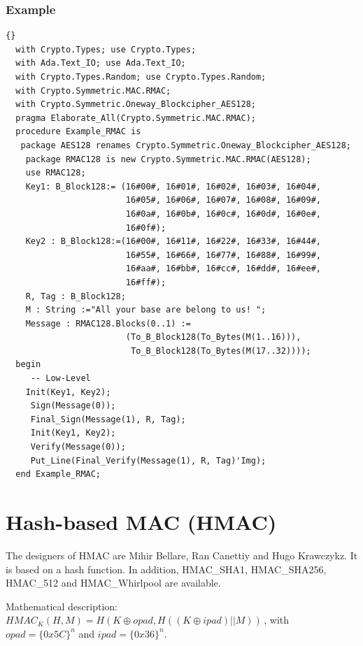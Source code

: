 \subsubsection*{Example}
\begin{lstlisting}{}
  with Crypto.Types; use Crypto.Types;
  with Ada.Text_IO; use Ada.Text_IO;
  with Crypto.Types.Random; use Crypto.Types.Random;
  with Crypto.Symmetric.MAC.RMAC;
  with Crypto.Symmetric.Oneway_Blockcipher_AES128;
  pragma Elaborate_All(Crypto.Symmetric.MAC.RMAC);
  procedure Example_RMAC is
   package AES128 renames Crypto.Symmetric.Oneway_Blockcipher_AES128;
    package RMAC128 is new Crypto.Symmetric.MAC.RMAC(AES128);
    use RMAC128;
    Key1: B_Block128:= (16#00#, 16#01#, 16#02#, 16#03#, 16#04#,
                        16#05#, 16#06#, 16#07#, 16#08#, 16#09#,
                        16#0a#, 16#0b#, 16#0c#, 16#0d#, 16#0e#,
                        16#0f#);
    Key2 : B_Block128:=(16#00#, 16#11#, 16#22#, 16#33#, 16#44#,
                        16#55#, 16#66#, 16#77#, 16#88#, 16#99#,
                        16#aa#, 16#bb#, 16#cc#, 16#dd#, 16#ee#,
                        16#ff#);
    R, Tag : B_Block128;
    M : String :="All your base are belong to us! ";
    Message : RMAC128.Blocks(0..1) :=
                        (To_B_Block128(To_Bytes(M(1..16))),
                         To_B_Block128(To_Bytes(M(17..32))));
  begin
     -- Low-Level
    Init(Key1, Key2);
  	 Sign(Message(0));
  	 Final_Sign(Message(1), R, Tag);
 	 Init(Key1, Key2);
  	 Verify(Message(0));
  	 Put_Line(Final_Verify(Message(1), R, Tag)'Img);
  end Example_RMAC;
\end{lstlisting}


\section{Hash-based MAC (HMAC)}
The designers of HMAC are Mihir Bellare, Ran Canettiy and Hugo
Krawczykz. It is based on a hash function. In addition, HMAC\_SHA1,
HMAC\_SHA256, HMAC\_512 and HMAC\_Whir\-lpool are
available.

Mathematical description: $HMAC_K(H,M)=H(K\oplus opad,H((K\oplus
ipad)||M))$\,, with $opad=\{0x5C\}^n$ and $ipad=\{0x36\}^n$.

